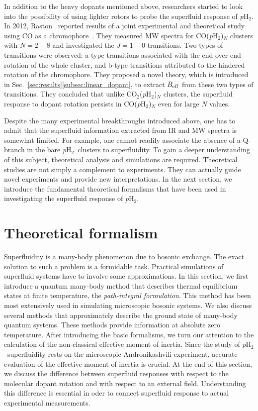 \documentclass[12pt]{iopart}
\newcommand{\phtwo}{{\em p}H$_2$}
\begin{document}
In addition to the heavy dopants mentioned above, researchers started to look into the possibility of using lighter rotors to probe the superfluid response of \phtwo. 
In 2012, Raston \etal~reported results of a joint experimental and theoretical study using CO as a chromophore~\cite{raston_coh2_superfluid}. 
They measured MW spectra for CO(\phtwo)$_N$ clusters with $N=2-8$ and investigated the $J=1-0$ transitions. 
Two types of transitions were observed: a-type transitions associated with the end-over-end rotation of the whole cluster, and b-type transitions attributed to the hindered rotation of the chromophore. 
They proposed a novel theory, which is introduced in Sec.~\ref{sec:results}\ref{subsec:linear_dopant}, to extract $B_{\rm eff}$ from these two types of transitions. 
They concluded that unlike CO$_2$(\phtwo)$_N$ clusters, the superfluid response to dopant rotation persists in CO(\phtwo)$_N$ even for large $N$ values.

Despite the many experimental breakthroughs introduced above, 
one has to admit that the superfluid information extracted from IR and MW spectra is somewhat limited. 
For example, one cannot readily associate the absence of a Q-branch in the bare \phtwo~clusters to  superfluidity. 
To gain a deeper understanding of this subject, theoretical analysis and simulations are required. 
Theoretical studies are not simply a complement to experiments. 
They can actually guide novel experiments and provide new interpretations. 
In the next section, we introduce the fundamental theoretical formalisms that have been used in investigating the superfluid response of \phtwo.

\section{Theoretical formalism} \label{sec:formu}

Superfluidity is a many-body phenomenon due to bosonic exchange.
The exact solution to such a  problem is a formidable task. 
Practical simulations of superfluid systems have to involve some approximations. 
In this section, we first introduce a quantum many-body method that describes thermal equilibrium states at finite temperature, 
the {\em path-integral formulation}. 
This method has been most extensively used in simulating microscopic bosonic systems. 
We also discuss several methods that approximately describe the ground state of many-body quantum systems. 
These methods provide information at absolute zero temperature. 
After introducing the basic formalisms, we turn our attention to the calculation of the non-classical effective moment of inertia. 
Since the study of \phtwo~superfluidity rests on the microscopic Andronikashvili experiment, 
accurate evaluation of the effective moment of inertia is  crucial. 
At the end of this section, we discuss the difference between superfluid responses with respect to the molecular dopant rotation and with respect to an external field. 
Understanding this difference is essential in oder to connect  superfluid response to actual experimental measurements.
\end{document}
